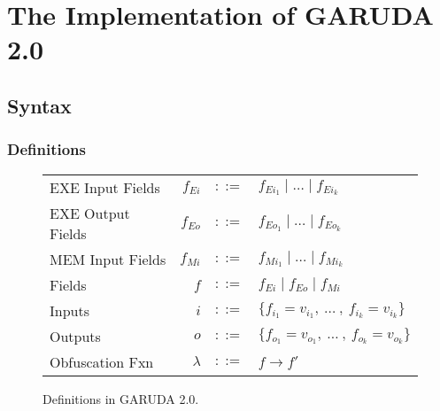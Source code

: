\documentclass[12pt, letterpaper]{article}
\def \sysname {\textsc{GARUDA 2.0}\xspace}
\begin{document}


  \section{The Implementation of \sysname}\label{sec:spec}

    \subsection{Syntax}\label{sec:spec:synt}
      \subsubsection{Definitions}\label{sec:spec:synt:defn}
        \begin{figure}
          \centering
          \begin{tabular}{l r c l}
            EXE Input Fields  & $f_{Ei}$  & $::=$ & $f_{Ei_{1}} \mid \dots \mid f_{Ei_{k}}$\\
            EXE Output Fields & $f_{Eo}$  & $::=$ & $f_{Eo_{1}} \mid \dots \mid f_{Eo_{k}}$\\
            MEM Input Fields  & $f_{Mi}$  & $::=$ & $f_{Mi_{1}} \mid \dots \mid f_{Mi_{k}}$\\
            Fields            & $f$       & $::=$ & $f_{Ei} \mid f_{Eo} \mid f_{Mi} $ \\
            Inputs            & $i$       & $::=$ & $\{f_{i_{1}} = v_{i_{1}} ,\ \dots\ ,\ f_{i_{k}} = v_{i_{k}}\}$\\
            Outputs           & $o$       & $::=$ & $\{f_{o_{1}} = v_{o_{1}} ,\ \dots\ ,\ f_{o_{k}} = v_{o_{k}}\}$\\
            Obfuscation Fxn   & $\lambda$ & $::=$ & $f \rightarrow f'$
          \end{tabular}
          \caption{Definitions in \sysname.}
          \label{fig:spec:synt:defn}
        \end{figure}
\end{document}
